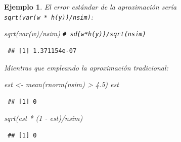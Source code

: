 \documentclass[
]{book}
\newenvironment{Shaded}{\begin{snugshade}}{\end{snugshade}}
\newcommand{\CommentTok}[1]{\textcolor[rgb]{0.56,0.35,0.01}{\textit{#1}}}
\newcommand{\DecValTok}[1]{\textcolor[rgb]{0.00,0.00,0.81}{#1}}
\newcommand{\FloatTok}[1]{\textcolor[rgb]{0.00,0.00,0.81}{#1}}
\newcommand{\FunctionTok}[1]{\textcolor[rgb]{0.00,0.00,0.00}{#1}}
\newcommand{\NormalTok}[1]{#1}
\newcommand{\OtherTok}[1]{\textcolor[rgb]{0.56,0.35,0.01}{#1}}
\newcommand{\SpecialCharTok}[1]{\textcolor[rgb]{0.00,0.00,0.00}{#1}}
\theoremstyle{break}
\newtheorem{example}{Ejemplo}[chapter]
\theoremstyle{nonumberplain}
\renewcommand{\CommentTok}[1]{\textcolor[rgb]{0.41,0.41,0.41}{\texttt{#1}}}
\begin{document}
\begin{example}
El error estándar de la aproximación sería \texttt{sqrt(var(w\ *\ h(y))/nsim)}:

\begin{Shaded}
\begin{Highlighting}[]
\FunctionTok{sqrt}\NormalTok{(}\FunctionTok{var}\NormalTok{(w)}\SpecialCharTok{/}\NormalTok{nsim) }\CommentTok{\# sd(w*h(y))/sqrt(nsim)   }
\end{Highlighting}
\end{Shaded}

\begin{verbatim}
 ## [1] 1.371154e-07
\end{verbatim}

Mientras que empleando la aproximación tradicional:

\begin{Shaded}
\begin{Highlighting}[]
\NormalTok{est }\OtherTok{\textless{}{-}} \FunctionTok{mean}\NormalTok{(}\FunctionTok{rnorm}\NormalTok{(nsim) }\SpecialCharTok{\textgreater{}} \FloatTok{4.5}\NormalTok{)}
\NormalTok{est}
\end{Highlighting}
\end{Shaded}

\begin{verbatim}
 ## [1] 0
\end{verbatim}

\begin{Shaded}
\begin{Highlighting}[]
\FunctionTok{sqrt}\NormalTok{(est }\SpecialCharTok{*}\NormalTok{ (}\DecValTok{1} \SpecialCharTok{{-}}\NormalTok{ est)}\SpecialCharTok{/}\NormalTok{nsim)}
\end{Highlighting}
\end{Shaded}

\begin{verbatim}
 ## [1] 0
\end{verbatim}

\end{example}
\end{document}
